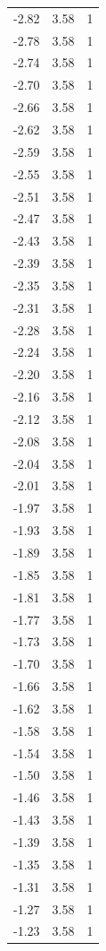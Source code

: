 \begin{longtable}{lrr}
  -2.82 & 3.58 & 1 \\
  -2.78 & 3.58 & 1 \\
  -2.74 & 3.58 & 1 \\
  -2.70 & 3.58 & 1 \\
  -2.66 & 3.58 & 1 \\
  -2.62 & 3.58 & 1 \\
  -2.59 & 3.58 & 1 \\
  -2.55 & 3.58 & 1 \\
  -2.51 & 3.58 & 1 \\
  -2.47 & 3.58 & 1 \\
  -2.43 & 3.58 & 1 \\
  -2.39 & 3.58 & 1 \\
  -2.35 & 3.58 & 1 \\
  -2.31 & 3.58 & 1 \\
  -2.28 & 3.58 & 1 \\
  -2.24 & 3.58 & 1 \\
  -2.20 & 3.58 & 1 \\
  -2.16 & 3.58 & 1 \\
  -2.12 & 3.58 & 1 \\
  -2.08 & 3.58 & 1 \\
  -2.04 & 3.58 & 1 \\
  -2.01 & 3.58 & 1 \\
  -1.97 & 3.58 & 1 \\
  -1.93 & 3.58 & 1 \\
  -1.89 & 3.58 & 1 \\
  -1.85 & 3.58 & 1 \\
  -1.81 & 3.58 & 1 \\
  -1.77 & 3.58 & 1 \\
  -1.73 & 3.58 & 1 \\
  -1.70 & 3.58 & 1 \\
  -1.66 & 3.58 & 1 \\
  -1.62 & 3.58 & 1 \\
  -1.58 & 3.58 & 1 \\
  -1.54 & 3.58 & 1 \\
  -1.50 & 3.58 & 1 \\
  -1.46 & 3.58 & 1 \\
  -1.43 & 3.58 & 1 \\
  -1.39 & 3.58 & 1 \\
  -1.35 & 3.58 & 1 \\
  -1.31 & 3.58 & 1 \\
  -1.27 & 3.58 & 1 \\
  -1.23 & 3.58 & 1 \\

\end{longtable}
